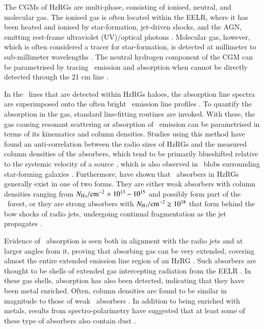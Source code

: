 The CGMs of HzRGs are multi-phase, consisting of ionised, neutral, and molecular gas. The ionised gas is often located within the EELR, where it has been heated and ionised by star-formation, jet-driven shocks, and the AGN, emitting rest-frame ultraviolet (UV)/optical photons \citep[e.g.][]{villar-martin1997,debreuck1999,debreuck2000,best2000a,vernet2001,binette2003,villar-martin2007,humphrey2008a}. Molecular gas, however, which is often considered a tracer for star-formation, is detected at millimeter to sub-millimeter wavelengths \citep{emonts2015}. The neutral hydrogen component of the CGM can be parametrised by tracing \lya~emission and absorption when  cannot be directly detected through the 21 cm line \citep[e.g.][]{barnes2014}.

In the \lya~lines that are detected within HzRGs haloes, the absorption line spectra are superimposed onto the often bright \lya~emission line profiles \citep[e.g.][]{rottgering1995}. To quantify the absorption in the gas, standard line-fitting routines are invoked. With these, the  gas causing resonant scattering or absorption of \lya~emission can be parametrised in terms of its kinematics and column densities. Studies using this method have found an anti-correlation between the radio sizes of HzRGs and the measured  column densities of the absorbers, which tend to be primarily blueshifted relative to the systemic velocity of a source \citep{vanojik1997}, which is also observed in \lya~blobs surrounding star-forming galaxies \citep{wilman2005}. Furthermore, \citet{wilman2004} have shown that \lya~absorbers in HzRGs generally exist in one of two forms. They are either weak absorbers with column densities ranging from $N_\ion{H}{I}/{\rm cm}^{-2} \simeq 10^{13} - 10^{15}$  and possibly form part of the \lya~forest, or they are strong absorbers with $N_\ion{H}{I}/{\rm cm}^{-2} \gtrsim 10^{18}$ that form behind the bow shocks of radio jets, undergoing continual fragmentation as the jet propagates \citep{krause2002,krause2005}.

Evidence of \lya~absorption is seen both in alignment with the radio jets and at larger angles from it, proving that  absorbing gas can be very extended, covering almost the entire extended emission line region of an HzRG \citep[][\citealp{silva2018b} is S18 from hereon]{humphrey2008b,swinbank2015,silva2018a}. Such absorbers are thought to be shells of extended gas intercepting radiation from the EELR \citep{binette2000}. In these gas shells,  absorption has also been detected, indicating that they have been metal enriched. Often,  column densities are found to be similar in magnitude to those of weak \lya~absorbers \citep{villar-martin1999b,jarvis2003,wilman2004}. In addition to being enriched with metals, results from spectro-polarimetry have suggested that at least some of these type of absorbers also contain dust \citep{humphrey2013}.

